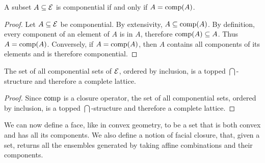 \begin{mathSection}
	\begin{coro}
		A subset $A \subseteq \mathcal{E}$ is componential if and only if $A = \mathrm{comp}(A)$.
	\end{coro}
	
	\begin{proof}
		Let $A \subseteq \mathcal{E}$ be componential. By extensivity, $A \subseteq \mathrm{comp}(A)$. By definition, every component of an element of $A$ is in $A$, therefore $\mathrm{comp}(A) \subseteq A$. Thus $A = \mathrm{comp}(A)$. Conversely, if $A = \mathrm{comp}(A)$, then $A$ contains all components of its elements and is therefore componential.
	\end{proof}
	
	\begin{prop}
		The set of all componential sets of $\mathcal{E}$, ordered by inclusion, is a topped $\bigcap$-structure and therefore a complete lattice.
	\end{prop}
	
	\begin{proof}
		Since $\mathrm{comp}$ is a closure operator, the set of all componential sets, ordered by inclusion, is a topped $\bigcap$-structure and therefore a complete lattice.
	\end{proof}
\end{mathSection}

We can now define a face, like in convex geometry, to be a set that is both convex and has all its components. We also define a notion of facial closure, that, given a set, returns all the ensembles generated by taking affine combinations and their components.

